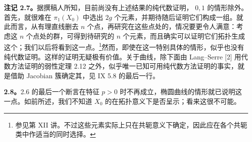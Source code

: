 \textbf{注记 2.7。}据撰稿人所知，目前尚没有上述结果的纯代数证明， $0,1$ 的情形除外。首先，就很难在 $\pi_1(X_0)$ 中选出 $2g$ 个元素，并期待随后证明它们构成一组。就此而言，从有理直线删去 $n$ 个点，再研究在这些点处的，情况要更令人满意：考虑这 $n$ 个点处的群，可得到待研究的 $n$ 个元素，而且确实可以证明它们拓扑生成这个；我们以后将看到这一点。\footnote{参见第 XII 讲。不过这些元素实际上只在共轭意义下确定，因此应在各个共轭类中作适当的同时选择。}然而，即使在这一特别具体的情形，似乎也没有纯代数证明。这样的证明无疑极有价值。关于曲线，除下面由 Lang–Serre [2] 用代数方法证明的弱性定理 2.12 之外，似乎唯一已知可用纯代数方法证明的事实，就是借助 Jacobian 簇确定其，见 IX 5.8 的最后一行。

\textbf{2.8。}2.6 的最后一个断言在特征 $p>0$ 时不再成立，椭圆曲线的情形就已说明这一点。如前所述，我们不知道 $X_0$ 的在拓扑意义下是否呈示；看来这很不可能。


